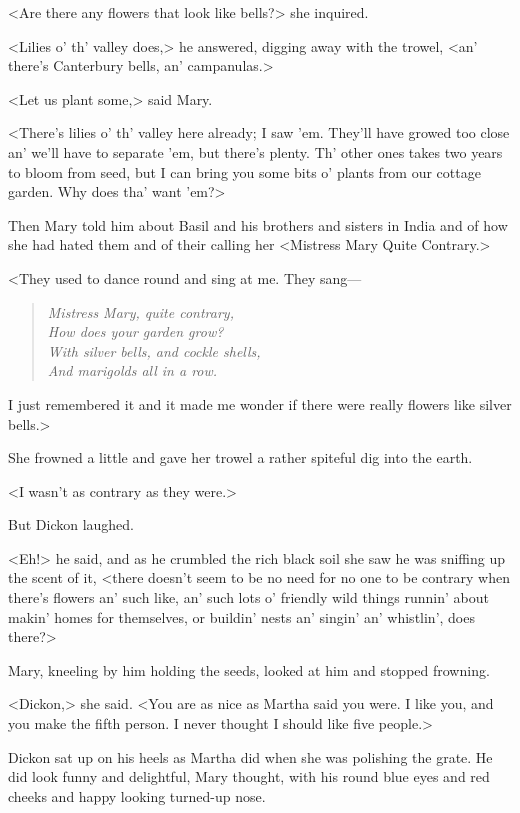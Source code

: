 <Are there any flowers that look like bells?> she inquired.

<Lilies o' th' valley does,> he answered, digging away with the trowel, <an' there's Canterbury bells, an' campanulas.>

<Let us plant some,> said Mary.

<There's lilies o' th' valley here already; I saw 'em. They'll have growed too close an' we'll have to separate 'em, but there's plenty. Th' other ones takes two years to bloom from seed, but I can bring you some bits o' plants from our cottage garden. Why does tha' want 'em?>

Then Mary told him about Basil and his brothers and sisters in India and of how she had hated them and of their calling her <Mistress Mary Quite Contrary.>

<They used to dance round and sing at me. They sang—

\begin{verse}
	\begin{altverse}\itshape
Mistress Mary, quite contrary,\\
How does your garden grow?\\
With silver bells, and cockle shells,\\
And marigolds all in a row.
\end{altverse}
\end{verse}

\noindent I just remembered it and it made me wonder if there were really flowers like silver bells.>

She frowned a little and gave her trowel a rather spiteful dig into the earth.

<I wasn't as contrary as they were.>

But Dickon laughed.

<Eh!> he said, and as he crumbled the rich black soil she saw he was sniffing up the scent of it, <there doesn't seem to be no need for no one to be contrary when there's flowers an' such like, an' such lots o' friendly wild things runnin' about makin' homes for themselves, or buildin' nests an' singin' an' whistlin', does there?>

Mary, kneeling by him holding the seeds, looked at him and stopped frowning.

<Dickon,> she said. <You are as nice as Martha said you were. I like you, and you make the fifth person. I never thought I should like five people.>

Dickon sat up on his heels as Martha did when she was polishing the grate. He did look funny and delightful, Mary thought, with his round blue eyes and red cheeks and happy looking turned-up nose.

